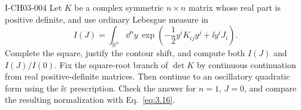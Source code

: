 \begin{exercise}{I-CH03-004}
Let $K$ be a complex symmetric $n\times n$ matrix whose real part is positive
definite, and use ordinary Lebesgue measure in
\[
 I(J)=\int_{\mathbb R^n}\dd^ny\,
 \exp\!\left(-\frac12y^iK_{ij}y^j+\ii y^iJ_i\right).
\]
Complete the square, justify the contour shift, and compute both $I(J)$ and
$I(J)/I(0)$.  Fix the square-root branch of $\det K$ by continuous
continuation from real positive-definite matrices.  Then continue to an
oscillatory quadratic form using the $\ii\varepsilon$ prescription.  Check the
answer for $n=1$, $J=0$, and compare the resulting normalization with
Eq.~\eqref{eq:3.16}.
\end{exercise}
